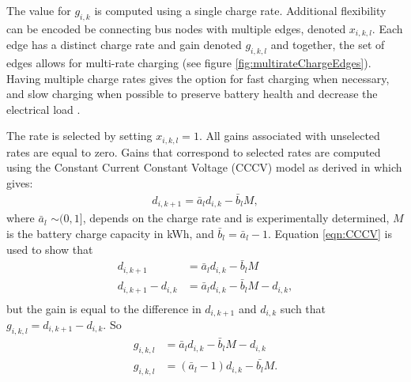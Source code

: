 \par The value for $g_{i,k}$ is computed using a single charge rate. Additional flexibility can be encoded be connecting bus nodes with multiple edges, denoted $x_{i,k,l}$. Each edge has a distinct charge rate and gain denoted $g_{i,k,l}$ and together, the set of edges allows for multi-rate charging (see figure \ref{fig:multirateChargeEdges}). Having multiple charge rates gives the option for fast charging when necessary, and slow charging when possible to preserve battery health and decrease the electrical load \cite{houbbadi_optimal_2019}.


\par The rate is selected by setting $x_{i,k,l} = 1$. All gains associated with unselected rates are equal to zero. Gains that correspond to selected rates are computed using the Constant Current Constant Voltage (CCCV) model as derived in \cite{whitaker_network_2021} which gives:
\begin{align}\label{eqn:CCCV}
	d_{i,k+1} = \bar{a}_ld_{i,k} - \bar{b}_lM, 
\end{align}
where $\bar{a}_l$ $\sim(0,1]$, depends on the charge rate and is experimentally determined, $M$ is the battery charge capacity in kWh, and $\bar{b}_l = \bar{a}_l - 1$.
Equation \ref{eqn:CCCV} is used to show that
\begin{equation}\label{eqn:g}
\begin{aligned}
	d_{i,k+1} &= \bar{a}_ld_{i,k} - \bar{b}_lM \\ 
	d_{i,k+1} - d_{i,k} &= \bar{a}_ld_{i,k} - \bar{b}_lM - d_{i,k},\\
\end{aligned}
\end{equation}
but the gain is equal to the difference in $d_{i,k+1}$ and $d_{i,k}$ such that $g_{i,k,l} = d_{i,k+1} - d_{i,k}$.  So
\begin{equation}\label{eqn:CCCVFinal}
\begin{aligned}
	g_{i,k,l}  &= \bar{a}_ld_{i,k} - \bar{b}_lM - d_{i,k}\\
	g_{i,k,l}  &= (\bar{a}_l - 1)d_{i,k} - \bar{b_l}M.\\
\end{aligned}
\end{equation}

